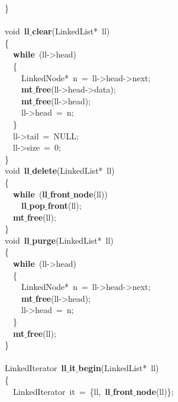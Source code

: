 \documentclass{article}
\begin{document}
\mbox{}\} \\
\mbox{} \\
\mbox{}void\ \textbf{ll$\_$clear}(LinkedList*\ ll) \\
\mbox{}\{ \\
\mbox{}\ \ \textbf{while}\ (ll-\textgreater{}head) \\
\mbox{}\ \ \{ \\
\mbox{}\ \ \ \ LinkedNode*\ n\ =\ ll-\textgreater{}head-\textgreater{}next; \\
\mbox{}\ \ \ \ \textbf{mt$\_$free}(ll-\textgreater{}head-\textgreater{}data); \\
\mbox{}\ \ \ \ \textbf{mt$\_$free}(ll-\textgreater{}head); \\
\mbox{}\ \ \ \ ll-\textgreater{}head\ =\ n; \\
\mbox{}\ \ \} \\
\mbox{}\ \ ll-\textgreater{}tail\ =\ NULL; \\
\mbox{}\ \ ll-\textgreater{}size\ =\ 0; \\
\mbox{}\} \\
\mbox{}void\ \textbf{ll$\_$delete}(LinkedList*\ ll) \\
\mbox{}\{ \\
\mbox{}\ \ \textbf{while}\ (\textbf{ll$\_$front$\_$node}(ll)) \\
\mbox{}\ \ \ \ \textbf{ll$\_$pop$\_$front}(ll); \\
\mbox{}\ \ \textbf{mt$\_$free}(ll); \\
\mbox{}\} \\
\mbox{}void\ \textbf{ll$\_$purge}(LinkedList*\ ll) \\
\mbox{}\{ \\
\mbox{}\ \ \textbf{while}\ (ll-\textgreater{}head) \\
\mbox{}\ \ \{ \\
\mbox{}\ \ \ \ LinkedNode*\ n\ =\ ll-\textgreater{}head-\textgreater{}next; \\
\mbox{}\ \ \ \ \textbf{mt$\_$free}(ll-\textgreater{}head); \\
\mbox{}\ \ \ \ ll-\textgreater{}head\ =\ n; \\
\mbox{}\ \ \} \\
\mbox{}\ \ \textbf{mt$\_$free}(ll); \\
\mbox{}\} \\
\mbox{} \\
\mbox{}LinkedIterator\ \textbf{ll$\_$it$\_$begin}(LinkedList*\ ll) \\
\mbox{}\{ \\
\mbox{}\ \ LinkedIterator\ it\ =\ \{ll,\ \textbf{ll$\_$front$\_$node}(ll)\}; \\
\end{document}
